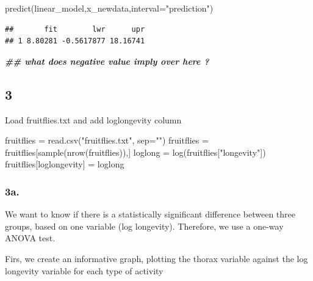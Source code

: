 \documentclass[
]{article}
\newenvironment{Shaded}{\begin{snugshade}}{\end{snugshade}}
\newcommand{\AttributeTok}[1]{\textcolor[rgb]{0.77,0.63,0.00}{#1}}
\newcommand{\DocumentationTok}[1]{\textcolor[rgb]{0.56,0.35,0.01}{\textbf{\textit{#1}}}}
\newcommand{\FunctionTok}[1]{\textcolor[rgb]{0.00,0.00,0.00}{#1}}
\newcommand{\NormalTok}[1]{#1}
\newcommand{\OtherTok}[1]{\textcolor[rgb]{0.56,0.35,0.01}{#1}}
\newcommand{\StringTok}[1]{\textcolor[rgb]{0.31,0.60,0.02}{#1}}
\begin{document}
\begin{Shaded}
\begin{Highlighting}[]
\FunctionTok{predict}\NormalTok{(linear\_model,x\_newdata,}\AttributeTok{interval=}\StringTok{"prediction"}\NormalTok{)}
\end{Highlighting}
\end{Shaded}

\begin{verbatim}
##       fit        lwr      upr
## 1 8.80281 -0.5617877 18.16741
\end{verbatim}

\begin{Shaded}
\begin{Highlighting}[]
\DocumentationTok{\#\# what does negative value imply over here ?}
\end{Highlighting}
\end{Shaded}

\hypertarget{section-2}{%
\subsection{3}\label{section-2}}

Load fruitflies.txt and add loglongevity column

\begin{Shaded}
\begin{Highlighting}[]
\NormalTok{fruitflies }\OtherTok{=} \FunctionTok{read.csv}\NormalTok{(}\StringTok{"fruitflies.txt"}\NormalTok{, }\AttributeTok{sep=}\StringTok{""}\NormalTok{)}
\NormalTok{fruitflies }\OtherTok{=}\NormalTok{ fruitflies[}\FunctionTok{sample}\NormalTok{(}\FunctionTok{nrow}\NormalTok{(fruitflies)),]}
\NormalTok{loglong }\OtherTok{=} \FunctionTok{log}\NormalTok{(fruitflies[}\StringTok{"longevity"}\NormalTok{])}
\NormalTok{fruitflies[}\StringTok{\textquotesingle{}loglongevity\textquotesingle{}}\NormalTok{] }\OtherTok{=}\NormalTok{ loglong}
\end{Highlighting}
\end{Shaded}

\hypertarget{a.-1}{%
\subsubsection{3a.}\label{a.-1}}

We want to know if there is a statistically significant difference
between three groups, based on one variable (log longevity). Therefore,
we use a one-way ANOVA test.

Firs, we create an informative graph, plotting the thorax variable
against the log longevity variable for each type of activity
\end{document}
